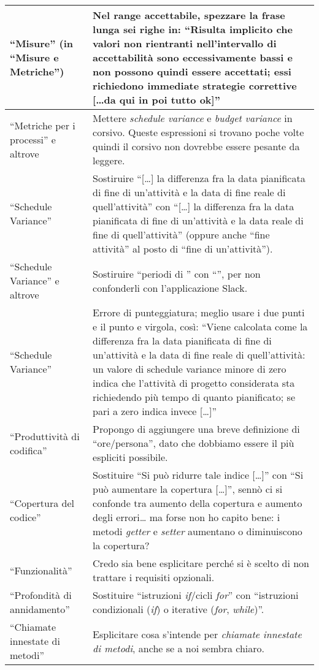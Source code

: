 \documentclass[a4paper]{article}
\begin{document}
\begin{table}
\begin{tabular}{| p{3cm} | p{10cm} |}
	“Misure” (in “Misure e Metriche”) & Nel range accettabile, spezzare la frase lunga sei righe in: “Risulta implicito che valori non rientranti nell'intervallo di accettabilità sono eccessivamente bassi e non possono quindi essere accettati; essi richiedono immediate strategie correttive [\dots da qui in poi tutto ok]” \\ \hline
	“Metriche per i processi” e altrove & Mettere \emph{schedule variance} e \emph{budget variance} in corsivo. Queste espressioni si trovano poche volte quindi il corsivo non dovrebbe essere pesante da leggere. \\ \hline
	“Schedule Variance” & Sostiruire “[\dots] la differenza fra la data pianificata di fine di un’attività e la data di fine reale di quell'attività” con “[\dots] la differenza fra la data pianificata di fine di un’attività e la data reale di fine di quell'attività” (oppure anche “fine attività” al posto di “fine di un'attività”). \\ \hline
	“Schedule Variance” e altrove & Sostiruire “periodi di \gloss{slack}” con “\gloss{periodi di slack}”, per non confonderli con l'applicazione Slack. \\ \hline
	“Schedule Variance” & Errore di punteggiatura; meglio usare i due punti e il punto e virgola, così: “Viene calcolata come la differenza fra la data pianificata di fine di un'attività e la data di fine reale di quell'attività: un valore di schedule variance minore di zero indica che l'attività di progetto considerata sta richiedendo più tempo di quanto pianificato; se pari a zero indica invece [\dots]” \\ \hline
	“Produttività di codifica” & Propongo di aggiungere una breve definizione di “ore/persona”, dato che dobbiamo essere il più espliciti possibile. \\ \hline
	“Copertura del codice” & Sostituire “Si può ridurre tale indice [\dots]” con “Si può aumentare la copertura [\dots]”, sennò ci si confonde tra aumento della copertura e aumento degli errori\dots{} ma forse non ho capito bene: i metodi \emph{getter} e \emph{setter} aumentano o diminuiscono la copertura? \\ \hline
	“Funzionalità” & Credo sia bene esplicitare perché si è scelto di non trattare i requisiti opzionali. \\ \hline
	“Profondità di annidamento” & Sostituire “istruzioni \emph{if}/cicli \emph{for}” con “istruzioni condizionali (\emph{if}) o iterative (\emph{for}, \emph{while})”. \\ \hline
	“Chiamate innestate di metodi” & Esplicitare cosa s'intende per \emph{chiamate innestate di metodi}, anche se a noi sembra chiaro. \\ \hline

\end{tabular}
\end{table}
\end{document}

